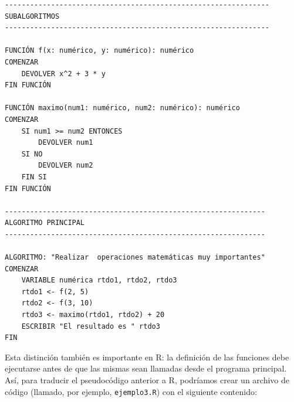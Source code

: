 \documentclass[
]{book}
\begin{document}
\begin{verbatim}
---------------------------------------------------------------
SUBALGORITMOS
---------------------------------------------------------------

FUNCIÓN f(x: numérico, y: numérico): numérico
COMENZAR
    DEVOLVER x^2 + 3 * y
FIN FUNCIÓN

FUNCIÓN maximo(num1: numérico, num2: numérico): numérico
COMENZAR
    SI num1 >= num2 ENTONCES
        DEVOLVER num1
    SI NO
        DEVOLVER num2
    FIN SI
FIN FUNCIÓN

--------------------------------------------------------------
ALGORITMO PRINCIPAL
--------------------------------------------------------------

ALGORITMO: "Realizar  operaciones matemáticas muy importantes"
COMENZAR
    VARIABLE numérica rtdo1, rtdo2, rtdo3
    rtdo1 <- f(2, 5)
    rtdo2 <- f(3, 10)
    rtdo3 <- maximo(rtdo1, rtdo2) + 20
    ESCRIBIR "El resultado es " rtdo3
FIN
\end{verbatim}

Esta distinción también es importante en R: la definición de las funciones debe ejecutarse antes de que las mismas sean llamadas desde el programa principal. Así, para traducir el pseudocódigo anterior a R, podríamos crear un archivo de código (llamado, por ejemplo, \texttt{ejemplo3.R}) con el siguiente contenido:
\end{document}

